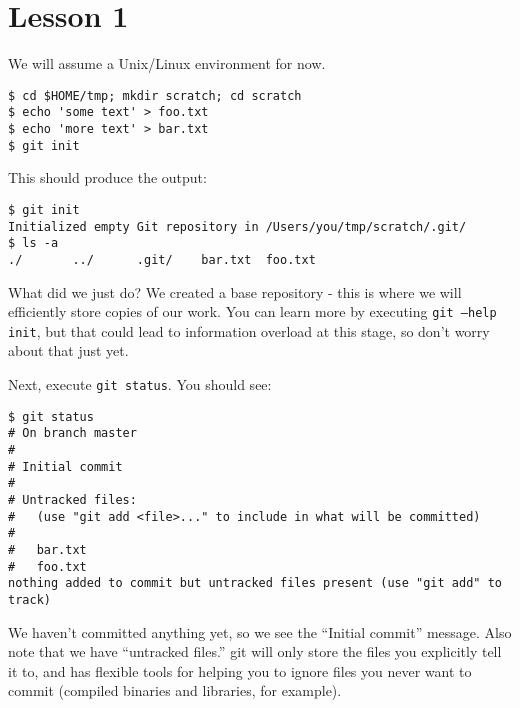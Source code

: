 
\section{Lesson 1}

We will assume a Unix/Linux environment for now.

\begin{verbatim}
$ cd $HOME/tmp; mkdir scratch; cd scratch
$ echo 'some text' > foo.txt
$ echo 'more text' > bar.txt
$ git init
\end{verbatim} 

This should produce the output:
\begin{verbatim}
$ git init
Initialized empty Git repository in /Users/you/tmp/scratch/.git/
$ ls -a
./       ../      .git/    bar.txt  foo.txt
\end{verbatim}

What did we just do? We created a base repository - this is where we will efficiently store copies of our work. You can learn more by executing \texttt{git --help init}, but that could lead to information overload at this stage, so don't worry about that just yet.

Next, execute \texttt{git status}. You should see:
\begin{verbatim}
$ git status
# On branch master
#
# Initial commit
#
# Untracked files:
#   (use "git add <file>..." to include in what will be committed)
#
#	bar.txt
#	foo.txt
nothing added to commit but untracked files present (use "git add" to track)
\end{verbatim}

We haven't committed anything yet, so we see the ``Initial commit'' message. Also note that we have ``untracked files.'' git will only store the files you explicitly tell it to, and has flexible tools for helping you to ignore files you never want to commit (compiled binaries and libraries, for example).

